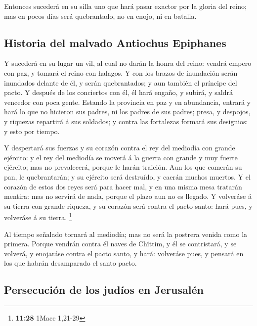  Entonces sucederá en su silla uno que hará pasar exactor
por la gloria del reino; mas en pocos días será quebrantado, no en
enojo, ni en batalla.

\hypertarget{historia-del-malvado-antiochus-epiphanes}{%
\subsection{Historia del malvado Antiochus
Epiphanes}\label{historia-del-malvado-antiochus-epiphanes}}

 Y sucederá en su lugar un vil, al cual no darán la honra
del reino: vendrá empero con paz, y tomará el reino con halagos.
 Y con los brazos de inundación serán inundados delante
de él, y serán quebrantados; y aun también el príncipe del pacto.
 Y después de los conciertos con él, él hará engaño, y
subirá, y saldrá vencedor con poca gente.  Estando la
provincia en paz y en abundancia, entrará y hará lo que no hicieron sus
padres, ni los padres de sus padres; presa, y despojos, y riquezas
repartirá á sus soldados; y contra las fortalezas formará sus designios:
y esto por tiempo.

 Y despertará sus fuerzas y su corazón contra el rey del
mediodía con grande ejército: y el rey del mediodía se moverá á la
guerra con grande y muy fuerte ejército; mas no prevalecerá, porque le
harán traición.  Aun los que comerán su pan, le
quebrantarán; y su ejército será destruído, y caerán muchos muertos.
 Y el corazón de estos dos reyes será para hacer mal, y
en una misma mesa tratarán mentira: mas no servirá de nada, porque el
plazo aun no es llegado.  Y volveráse á su tierra con
grande riqueza, y su corazón será contra el pacto santo: hará pues, y
volveráse á su tierra. \footnote{\textbf{11:28} 1Macc 1,21-29}

 Al tiempo señalado tornará al mediodía; mas no será la
postrera venida como la primera.  Porque vendrán contra
él naves de Chîttim, y él se contristará, y se volverá, y enojaráse
contra el pacto santo, y hará: volveráse pues, y pensará en los que
habrán desamparado el santo pacto.

\hypertarget{persecuciuxf3n-de-los-juduxedos-en-jerusaluxe9n}{%
\subsection{Persecución de los judíos en
Jerusalén}\label{persecuciuxf3n-de-los-juduxedos-en-jerusaluxe9n}}

